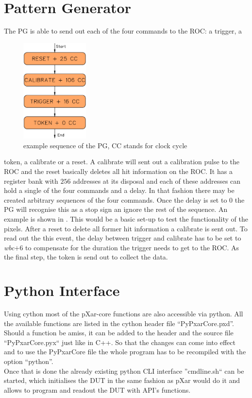 \documentclass[british,11pt,a4paper]{memoir}
\begin{document}
\section{Pattern Generator}
The \ac{PG} is able to send out each of the four commands to the \ac{ROC}: a trigger, a  
\begin{figure}
	\includegraphics[width=3.4cm]{PG}
	\caption{example sequence of the \ac{PG}, CC stands for clock cycle}
	\label{p14}
\end{figure} 
token, a calibrate or a reset. A calibrate will sent out a calibration pulse to the \ac{ROC} and the reset basically deletes all hit information on the \ac{ROC}. It has a register bank with $256$ addresses at its disposal and each of these addresses can hold a single of the four commands and a delay. In that fashion there may be created arbitrary sequences of the four commands. Once the delay is set to $0$ the \ac{PG} will recognise this as a stop sign an ignore the rest of the sequence. An example is shown in . This would be a basic set-up to test the functionality of the pixels. After a reset to delete all former hit information a calibrate is sent out. To read out the this event, the delay between trigger and calibrate has to be set to \textit{wbc}$+6$ to compensate for the duration the trigger needs to get to the \ac{ROC}. As the final step, the token is send out to collect the data.
\section{Python Interface}
Using cython most of the pXar-core functions are also accessible via python. All the available functions are listed in the cython header file \linebreak[4] ``PyPxarCore.pxd''. Should a function be amiss, it can be added to the header and the source file ``PyPxarCore.pyx`` just like in C++. So that the changes can come into effect and to use the PyPxarCore file the whole program has to be recompiled with the option ``python''.\\
Once that is done the already existing python \ac{CLI} interface ''cmdline.sh`` can be started, which initialises the \ac{DUT} in the same fashion as pXar would do it and allows to program and readout the \ac{DUT} with \ac{API}'s functions.
\end{document}

